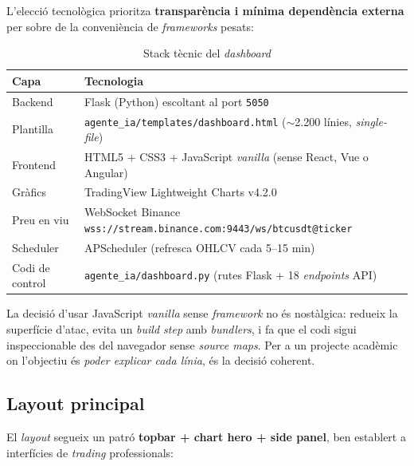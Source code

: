 \documentclass[12pt, a4paper]{report}
\begin{document}
L'elecció tecnològica prioritza \textbf{transparència i mínima dependència externa} per sobre de la conveniència de \textit{frameworks} pesats:

\begin{table}[H]
\centering
\caption{Stack tècnic del \textit{dashboard}}
\label{tab:stackdashboard}
\begin{tabular}{@{}L{4cm}L{9cm}@{}}
\toprule
\textbf{Capa} & \textbf{Tecnologia} \\
\midrule
Backend         & Flask (Python) escoltant al port \texttt{5050} \\
Plantilla       & \texttt{agente\_ia/templates/dashboard.html} ($\sim$2.200 línies, \textit{single-file}) \\
Frontend        & HTML5 + CSS3 + JavaScript \textit{vanilla} (sense React, Vue o Angular) \\
Gràfics         & TradingView Lightweight Charts v4.2.0 \\
Preu en viu     & WebSocket Binance \texttt{wss://stream.binance.com:9443/ws/btcusdt@ticker} \\
Scheduler       & APScheduler (refresca OHLCV cada 5--15 min) \\
Codi de control & \texttt{agente\_ia/dashboard.py} (rutes Flask + 18 \textit{endpoints} API) \\
\bottomrule
\end{tabular}
\end{table}

La decisió d'usar JavaScript \textit{vanilla} sense \textit{framework} no és nostàlgica: redueix la superfície d'atac, evita un \textit{build step} amb \textit{bundlers}, i fa que el codi sigui inspeccionable des del navegador sense \textit{source maps}. Per a un projecte acadèmic on l'objectiu és \textit{poder explicar cada línia}, és la decisió coherent.

\subsection{Layout principal}

El \textit{layout} segueix un patró \textbf{topbar + chart hero + side panel}, ben establert a interfícies de \textit{trading} professionals:
\end{document}
